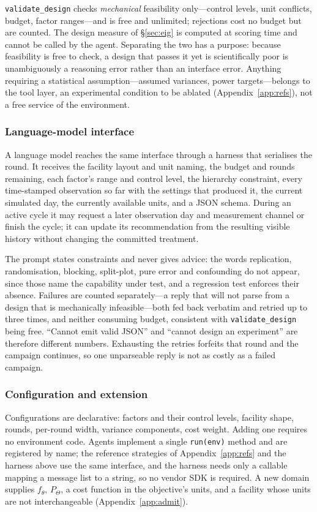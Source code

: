 \texttt{validate\_design} checks \emph{mechanical} feasibility only---control levels, unit
conflicts, budget, factor ranges---and is free and unlimited; rejections cost no budget but
are counted. The design measure of \S\ref{sec:eig} is computed at scoring time and
cannot be called by the agent. Separating the two has a purpose: because feasibility is
free to check, a design that passes it yet is scientifically poor is unambiguously a
reasoning error rather than an interface error. Anything requiring a statistical
assumption---assumed variances, power targets---belongs to the tool layer, an experimental
condition to be ablated (Appendix~\ref{app:refs}), not a free service of the environment.

\subsubsection{Language-model interface}
\label{sec:harness}

A language model reaches the same interface through a harness that serialises the round. It
receives the facility layout and unit naming, the budget and rounds remaining, each factor's
range and control level, the hierarchy constraint, every time-stamped observation so far with the settings
that produced it, the current simulated day, the currently available units, and a JSON
schema. During an active cycle it may request a later observation day and measurement
channel or finish the cycle; it can update its recommendation from the resulting visible
history without changing the committed treatment.

The prompt states constraints and never gives advice: the words replication, randomisation,
blocking, split-plot, pure error and confounding do not appear, since those name the
capability under test, and a regression test enforces their absence. Failures are counted
separately---a reply that will not parse from a design that is mechanically infeasible---both
fed back verbatim and retried up to three times, and neither consuming budget, consistent with
\texttt{validate\_design} being free. ``Cannot emit valid JSON'' and ``cannot design an
experiment'' are therefore different numbers. Exhausting the retries forfeits that round and
the campaign continues, so one unparseable reply is not as costly as a failed campaign.

\subsubsection{Configuration and extension}
\label{sec:interfaces}

Configurations are declarative: factors and their control levels, facility shape, rounds,
per-round width, variance components, cost weight. Adding one requires no environment code.
Agents implement a single \texttt{run(env)} method and are registered by name; the reference
strategies of Appendix~\ref{app:refs} and the harness above use the same interface, and the
harness needs only a callable mapping a message list to a string, so no vendor SDK is
required. A new domain supplies $f_\theta$, $P_\Theta$, a cost function in the
objective's units, and a facility whose units are not interchangeable
(Appendix~\ref{app:admit}).
